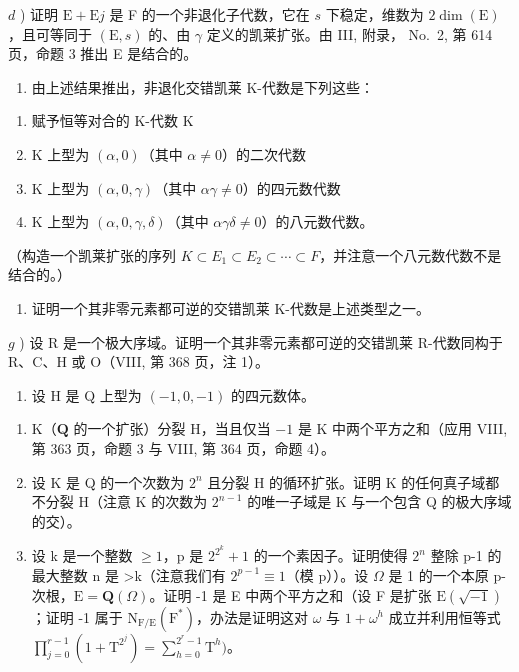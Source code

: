 \(d\) ) 证明 \(\mathrm{E} + \mathrm{E}j\) 是 F 的一个非退化子代数，它在 \(s\) 下稳定，维数为 \(2\dim (\mathrm{E})\)，且可等同于 \((\mathrm{E},s)\) 的、由 \(\gamma\) 定义的凯莱扩张。由 III, 附录， No.~2, 第 614 页，命题 3 推出 E 是结合的。

\begin{enumerate}
\def\labelenumi{\alph{enumi})}
\setcounter{enumi}{4}
\tightlist
\item
  由上述结果推出，非退化交错凯莱 K-代数是下列这些：
\end{enumerate}

\begin{enumerate}
\def\labelenumi{(\roman{enumi})}
\item
  赋予恒等对合的 K-代数 \(\mathrm{K}\)
\item
  K 上型为 \((\alpha,0)\)（其中 \(\alpha\neq0\)）的二次代数
\item
  K 上型为 \((\alpha,0,\gamma)\)（其中 \(\alpha\gamma\neq0\)）的四元数代数
\item
  \(\mathrm{K}\) 上型为 \((\alpha, 0, \gamma, \delta)\)（其中 \(\alpha \gamma \delta \neq 0\)）的八元数代数。
\end{enumerate}

（构造一个凯莱扩张的序列 \(K \subset E_{1} \subset E_{2} \subset \cdots \subset F\)，并注意一个八元数代数不是结合的。）

\begin{enumerate}
\def\labelenumi{\alph{enumi})}
\setcounter{enumi}{5}
\tightlist
\item
  证明一个其非零元素都可逆的交错凯莱 K-代数是上述类型之一。
\end{enumerate}

\(g\) ) 设 R 是一个极大序域。证明一个其非零元素都可逆的交错凯莱 R-代数同构于 R、C、H 或 O（VIII, 第 368 页，注 1）。

\begin{enumerate}
\def\labelenumi{\arabic{enumi})}
\setcounter{enumi}{5}
\tightlist
\item
  设 H 是 Q 上型为 \((-1,0,-1)\) 的四元数体。
\end{enumerate}

\begin{enumerate}
\def\labelenumi{\alph{enumi})}
\item
  \(\mathrm{K}\)（\(\mathbf{Q}\) 的一个扩张）分裂 \(\mathrm{H}\)，当且仅当 \(-1\) 是 \(\mathrm{K}\) 中两个平方之和（应用 VIII, 第 363 页，命题 3 与 VIII, 第 364 页，命题 4）。
\item
  设 K 是 Q 的一个次数为 \(2^{n}\) 且分裂 H 的循环扩张。证明 K 的任何真子域都不分裂 H（注意 K 的次数为 \(2^{n-1}\) 的唯一子域是 K 与一个包含 Q 的极大序域的交）。
\item
  设 k 是一个整数 \(\geqslant1\)，p 是 \(2^{2^{k}}+1\) 的一个素因子。证明使得 \(2^{n}\) 整除 p-1 的最大整数 n 是 \textgreater k（注意我们有 \(2^{p-1}\equiv1\)（模 p））。设 \(\Omega\) 是 1 的一个本原 p-次根，\(\mathrm{E}=\mathbf{Q}(\Omega)\)。证明 -1 是 E 中两个平方之和（设 F 是扩张 \(\mathrm{E}(\sqrt{-1})\)；证明 -1 属于 \(\mathrm{N}_{\mathrm{F}/\mathrm{E}}(\mathrm{F}^{*})\)，办法是证明这对 \(\omega\) 与 \(1+\omega^{h}\) 成立并利用恒等式 \(\prod_{j=0}^{r-1}(1+\mathrm{T}^{2^{j}})=\sum_{h=0}^{2^{r}-1}\mathrm{T}^{h})\)。
\end{enumerate}

